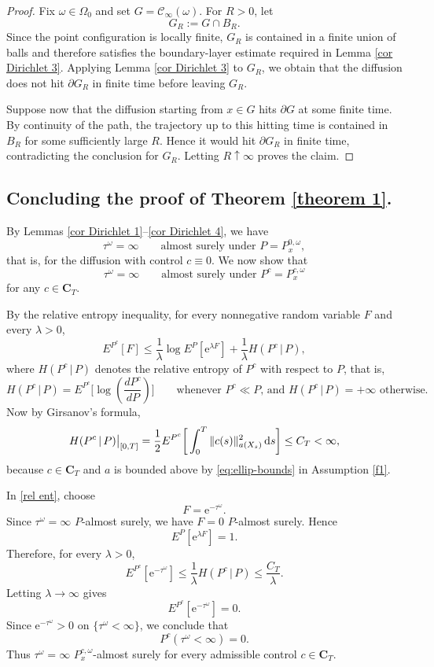 \documentclass[11pt]{article}
\renewcommand{\d}{{\rm d}}
\newcommand{\e}{\mathrm e}
\theoremstyle{rem}
\begin{document}
\begin{proof}
Fix $\omega\in\Omega_0$ and set $G=\mathcal C_\infty(\omega)$. For $R>0$, let
\[
G_R:=G\cap B_R.
\]
Since the point configuration is locally finite, $G_R$ is contained in a finite union of balls and therefore satisfies the boundary-layer estimate required in Lemma \ref{cor Dirichlet 3}. Applying Lemma \ref{cor Dirichlet 3} to $G_R$, we obtain that the diffusion does not hit $\partial G_R$ in finite time before leaving $G_R$.

Suppose now that the diffusion starting from $x\in G$ hits $\partial G$ at some finite time. By continuity of the path, the trajectory up to this hitting time is contained in $B_R$ for some sufficiently large $R$. Hence it would hit $\partial G_R$ in finite time, contradicting the conclusion for $G_R$. Letting $R\uparrow\infty$ proves the claim.
\end{proof}

\subsection{Concluding the proof of Theorem \ref{theorem 1}.}\label{subsec entropy}
By Lemmas \ref{cor Dirichlet 1}--\ref{cor Dirichlet 4}, we have
\[
\tau^\omega=\infty
\qquad
\mbox{almost surely under }P=P_x^{0,\omega},
\]
that is, for the diffusion with control $c\equiv0$. We now show that
\[
\tau^\omega=\infty
\qquad
\mbox{almost surely under }P^c=P_x^{c,\omega}
\]
for any $c\in\mathbf C_T$.

By the relative entropy inequality, for every nonnegative random variable $F$ and every $\lambda>0$,
\begin{equation}\label{rel ent}
E^{P^c}[F]
\leq
\frac1\lambda
\log E^P[\e^{\lambda F}]
+
\frac1\lambda H(P^c\,|\,P),
\end{equation}
where $H(P^c\,|\,P)$ denotes the relative entropy of $P^c$ with respect to
$P$, that is,
\[
H(P^c\,|\,P)
=
E^{P^c}\!\bigg[\log\!\left(\frac{dP^c}{dP}\right)\bigg] \qquad\mbox{whenever $P^c\ll P$, and $H(P^c\,|\,P)=+\infty$ otherwise.}
\]
Now by Girsanov's formula,
\begin{equation}\label{Girsanov}
H(P^c\,|\,P)\big|_{[0,T]}
=
\frac12
E^{P^c}
\bigg[
\int_0^T \|c(s)\|_{a(X_s)}^2\,\d s
\bigg]
\leq C_T<\infty,
\end{equation}
because $c\in\mathbf C_T$ and $a$ is bounded above by \eqref{eq:ellip-bounds} in Assumption \ref{f1}.

In \eqref{rel ent}, choose
\[
F=\e^{-\tau^\omega}.
\]
Since $\tau^\omega=\infty$ $P$-almost surely, we have $F=0$ $P$-almost surely. Hence
\[
E^P[\e^{\lambda F}]=1.
\]
Therefore, for every $\lambda>0$,
\[
E^{P^c}[\e^{-\tau^\omega}]
\leq
\frac1\lambda H(P^c\,|\,P)
\leq
\frac{C_T}{\lambda}.
\]
Letting $\lambda\to\infty$ gives
\[
E^{P^c}[\e^{-\tau^\omega}]=0.
\]
Since $\e^{-\tau^\omega}>0$ on $\{\tau^\omega<\infty\}$, we conclude that
\[
P^c(\tau^\omega<\infty)=0.
\]
Thus $\tau^\omega=\infty$ $P_x^{c,\omega}$-almost surely for every admissible control $c\in\mathbf C_T$.
\end{document}
